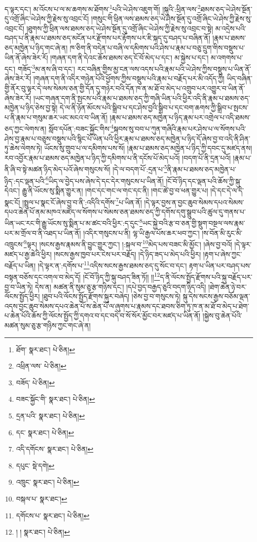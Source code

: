 ད་ལྟར་དང་། མ་འོངས་པ་ལ་མ་ཆགས་མ་ཐོགས་\footnote{ཐོག་  སྣར་ཐང་།  པེ་ཅིན། }པའི་ཡེ་ཤེས་འཇུག་གོ། །སྐུའི་:ཕྲིན་ལས་\footnote{འཕྲིན་ལས་  པེ་ཅིན། }ཐམས་ཅད་ཡེ་ཤེས་སྔོན་དུ་འགྲོ་ཞིང་ཡེ་ཤེས་ཀྱི་རྗེས་སུ་འབྲང་ངོ། །གསུང་གི་ཕྲིན་ལས་ཐམས་ཅད་ཡེ་ཤེས་སྔོན་དུ་འགྲོ་ཞིང་ཡེ་ཤེས་ཀྱི་རྗེས་སུ་འབྲང་ངོ། །ཐུགས་ཀྱི་ཕྲིན་ལས་ཐམས་ཅད་ཡེ་ཤེས་སྔོན་དུ་འགྲོ་ཞིང་ཡེ་ཤེས་ཀྱི་རྗེས་སུ་འབྲང་བ་སྟེ། མ་འདྲེས་པའི་བཤད་པ་ནི་རྣམ་པ་ཐམས་ཅད་མངོན་པར་རྫོགས་པར་རྟོགས་པར་ཇི་སྐད་དུ་བཤད་པ་བཞིན་ནོ། །རྣམ་པ་ཐམས་ཅད་མཁྱེན་པ་ཉིད་གང་ཞེ་ན། ཁ་ཅིག་ནི་བདེན་པ་བཞི་ལ་དམིགས་པའི་ཤེས་པ་རྣམ་པ་བཅུ་དྲུག་གིས་བསྡུས་པ་ཡིན་ནོ་ཞེས་ཟེར་རོ། །གཞན་དག་ནི་དེའང་ཆོས་ཐམས་ཅད་ངོ་བོ་མེད་པ་དང་། མ་སྐྱེས་པ་དང་། མ་འགགས་པ་དང་། གཟོད་\footnote{བཟོད་  པེ་ཅིན། }མ་ནས་ཞི་བ་དང་། རང་བཞིན་གྱིས་མྱ་ངན་ལས་འདས་པའི་རྣམ་པའི་ཡེ་ཤེས་ཀྱིས་བསྡུས་པ་ཡིན་ནོ་ཞེས་ཟེར་རོ། །གཞན་དག་ནི་འདིར་གཉེན་པོའི་ཕྱོགས་ཀྱིས་བསྡུས་པའི་རྣམ་པ་བརྗོད་པར་མི་འདོད་ཀྱི། ཡིད་བཞིན་གྱི་ནོར་བུ་ལྟར་དེ་ལས་སེམས་ཅན་གྱི་དོན་དུ་གཉེར་བའི་དོན་ཁ་ན་མ་ཐོ་བ་མེད་པ་འགྲུབ་པར་འགྱུར་བ་ཡིན་ནོ་ཞེས་ཟེར་རོ། །ཡང་གཞན་དག་ནི་སྤངས་པའི་རྣམ་པ་ཐམས་ཅད་ཀྱི་གཞི་ཡིན་པའི་ཕྱིར་འདི་ནི་རྣམ་པ་ཐམས་ཅད་མཁྱེན་པ་ཉིད་ཅེས་བྱ་སྟེ། དེ་ལ་ནི་ཉོན་མོངས་པའི་སྒྲིབ་པ་དང་ཤེས་བྱའི་སྒྲིབ་པ་དང་བག་ཆགས་ཀྱི་སྒྲིབ་པ་སྤངས་པ་ནི་རྣམ་པ་གསུམ་ཆར་ཡང་མངའ་བ་ཡིན་ནོ། །རྣམ་པ་ཐམས་ཅད་མཁྱེན་པ་ཉིད་རྣམ་པར་འགྲེལ་པ་འདི་ཐམས་ཅད་ཀྱང་ལེགས་ན། སློབ་དཔོན་:བཟང་སྐྱོང་གིས་\footnote{བཟང་སྐྱོང་གི་  སྣར་ཐང་།  པེ་ཅིན། }སྐབས་སུ་བབ་པ་ཀུན་གཞིའི་རྣམ་པར་ཤེས་པ་ལ་སོགས་པའི་ཤེས་བྱ་རྣམ་པ་བཅུས་བསྡུས་པའི་སྙིང་པོ་ཡིན་པའི་ཕྱིར་རྣམ་པ་ཐམས་ཅད་མཁྱེན་པ་ཉིད་དོ་ཞེས་བྱ་བ་འདི་ནི་ཤིན་ཏུ་ཆེས་ལེགས་ཏེ། ཡོངས་སུ་གྲུབ་པ་ལ་དམིགས་པས་སོ། །རྣམ་པ་ཐམས་ཅད་མཁྱེན་པ་ཉིད་ཀྱི་དབང་དུ་མཛད་ནས། རབ་འབྱོར་རྣམ་པ་ཐམས་ཅད་མཁྱེན་པ་ཉིད་ཀྱི་དམིགས་པ་ནི་དངོས་པོ་མེད་པའོ། །བདག་པོ་ནི་དྲན་པའོ། །རྣམ་པ་ནི་ཞི་བ་སྟེ་མཚན་ཉིད་མེད་པའོ་ཞེས་གསུངས་སོ། །དེ་ལ་བདག་པོ་:དྲན་པ་\footnote{དྲན་པའི་  སྣར་ཐང་།  པེ་ཅིན། }ནི་རྣམ་པ་ཐམས་ཅད་མཁྱེན་པ་ཉིད་:དང་ལྡན་པའི་\footnote{དང་  སྣར་ཐང་།  པེ་ཅིན། }ཡིད་ལ་བྱེད་པས་ཞེས་དེ་དང་དེར་གསུངས་པ་ཡིན་ནོ། །ངོ་བོ་ཉིད་དང་ལྡན་པའི་ཆོས་ཀྱི་སྐུ་དེའང་། རྒྱུ་ནི་ཡོངས་སུ་སྨིན་གྱུར་ན། །གང་དང་གང་ལ་གང་དང་ནི། །གང་ཚེ་བྱ་བ་ཕན་གྱུར་པ། །དེ་དང་དེ་ལ་དེ་སྣང་ངོ། །སྤྲུལ་པ་སྣང་ངོ་ཞེས་བྱ་བ་ནི་:འདིའི་དགོས་\footnote{འདི་དགོངས་  སྣར་ཐང་།  པེ་ཅིན། }པ་ཡིན་ནོ། །དེ་ལྟར་བྱས་ན་བྱང་ཆུབ་སེམས་དཔའ་སེམས་དཔའ་ཆེན་པོ་ནམ་མཁའ་མཛོད་ལ་སོགས་པ་སེམས་ཅན་ཐམས་ཅད་ཀྱི་དགོས་དགུ་སྒྲུབ་པའི་ཚུལ་དུ་གནས་པ་ཡིན་ཡང་རང་གི་རྒྱུ་ཡོངས་སུ་སྨིན་པ་མ་ཚང་བའི་ཕྱིར་:ད་དུང་\footnote{དཔུང་  སྡེ་དགེ། }ཡང་སྐྱེ་བའི་རྩ་བ་ཅན་གྱི་སྡུག་བསྔལ་ལས་རྣམ་པར་མ་གྲོལ་བ་ནི་འཐད་པ་ཡིན་ནོ། །འདིར་གསུངས་པ་ནི། ལྷ་ཡི་རྒྱལ་པོས་ཆར་ཕབ་ཀྱང་། །ས་བོན་མི་རུང་མི་འཁྲུངས་\footnote{འཁྲུང་  སྣར་ཐང་།  པེ་ཅིན། }ལྟར། །སངས་རྒྱས་རྣམས་ནི་བྱུང་གྱུར་ཀྱང་། །:སྐལ་བ་\footnote{བསྐལ་པ་  སྣར་ཐང་། }མེད་པས་བཟང་མི་མྱོང་། །ཞེས་བྱ་བའོ། །དེ་ལྟར་མཛད་པ་རྒྱ་ཆེའི་ཕྱིར། །སངས་རྒྱས་ཁྱབ་པར་ངེས་པར་བརྗོད། །དེ་ཉིད་ཟད་པ་མེད་པའི་ཕྱིར། །རྟག་པ་ཞེས་ཀྱང་བརྗོད་པ་ཡིན། །དེ་ལྟར་ན་:དགོས་པ་\footnote{དགོངས་པ་  སྣར་ཐང་།  པེ་ཅིན། }འདིས་སངས་རྒྱས་ཐམས་ཅད་དུ་སོང་བ་དང་། རྟག་པ་ཡིན་པར་བཤད་པས་བསྟན་བཅོས་དང་འགལ་བ་མེད་དོ། །ངོ་བོ་ཉིད་ཀྱི་སྐུ་བཤད་ཟིན་ཏོ།། །།\footnote{། །  སྣར་ཐང་།  པེ་ཅིན། }ད་ནི་ལོངས་སྤྱོད་རྫོགས་པའི་སྐུ་བརྗོད་པར་བྱ་བ་ཡིན་ཏེ། དེས་ན། མཚན་ནི་སུམ་ཅུ་རྩ་གཉིས་དང་། །དཔེ་བྱད་བརྒྱད་ཅུའི་བདག་ཉིད་འདི། །ཐེག་ཆེན་ཉེ་བར་ལོངས་སྤྱོད་ཕྱིར། །ཐུབ་པའི་ལོངས་སྤྱོད་རྫོགས་སྐུར་བཞེད། །ཅེས་བྱ་བ་གསུངས་ཏེ། སྐུ་དེས་སངས་རྒྱས་བཅོམ་ལྡན་འདས་བྱང་ཆུབ་སེམས་དཔའ་ཆེན་པོ་ས་ཆེན་པོ་ལ་ཞུགས་པ་རྣམས་དང་ཐབས་ཅིག་ཏུ་ཁ་ན་མ་ཐོ་བ་མེད་པ་ཐེག་པ་ཆེན་པོའི་ཆོས་ཀྱི་ལོངས་སྤྱོད་ཀྱི་དགའ་བ་དང་བདེ་བ་སོ་སོར་མྱོང་བར་མཛད་པ་ཡིན་ནོ། །སྐྱེས་བུ་ཆེན་པོའི་མཚན་སུམ་ཅུ་རྩ་གཉིས་ཀྱང་གང་ཞེ་ན། 